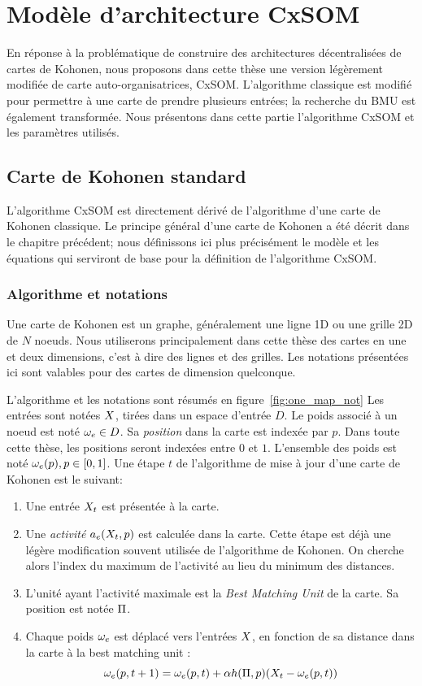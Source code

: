 \chapter{Modèle d'architecture CxSOM}
\graphicspath{{02-SOM/}}
\minitoc

En réponse à la problématique de construire des architectures décentralisées de cartes de Kohonen, nous proposons dans cette thèse une version légèrement modifiée de carte auto-organisatrices, CxSOM. L'algorithme classique est modifié pour permettre à une carte de prendre plusieurs entrées; la recherche du BMU est également transformée.
Nous présentons dans cette partie l'algorithme CxSOM et les paramètres utilisés.

\section{Carte de Kohonen standard}
L'algorithme CxSOM est directement dérivé de l'algorithme d'une carte de Kohonen classique. Le principe général d'une carte de Kohonen a été décrit dans le chapitre précédent; nous définissons ici plus précisément le modèle et les équations qui serviront de base pour la définition de l'algorithme CxSOM.

\subsection{Algorithme et notations}
Une carte de Kohonen est un graphe, généralement une ligne 1D ou une grille 2D de $N$ noeuds. Nous utiliserons principalement dans cette thèse des cartes en une et deux dimensions, c'est à dire des lignes et des grilles. Les notations présentées ici sont valables pour des cartes de dimension quelconque.

L'algorithme et les notations sont résumés en figure~\ref{fig:one_map_not}
Les entrées sont notées $X$, tirées dans un espace d'entrée $D$. Le poids associé à un noeud est noté $\omega_e \in D$. Sa \emph{position} dans la carte est indexée par $p$. Dans toute cette thèse, les positions seront indexées entre $0$ et $1$. L'ensemble des poids est noté ${\omega_e(p), p \in [0,1]}$.
Une étape $t$ de l'algorithme de mise à jour d'une carte de Kohonen est le suivant:
\begin{enumerate}
\item\label{enum:inp} Une entrée $X_t$ est présentée à la carte.
\item\label{enum:act} Une \emph{activité} $a_e(X_t,p)$ est calculée dans la carte. Cette étape est déjà une légère modification souvent utilisée de l'algorithme de Kohonen. On cherche alors l'index du maximum de l'activité au lieu du minimum des distances.
\item L'unité ayant l'activité maximale est la \emph{Best Matching Unit} de la carte. Sa position est notée $\Pi$.
\item Chaque poids $\omega_e$ est déplacé vers l'entrées $X$, en fonction de sa distance dans la carte à la best matching unit : 
\begin{equation}
\omega_e(p,t+1) = \omega_e(p,t) + \alpha h(\Pi,p)(X_t - \omega_e(p,t))
\label{eq:update}
\end{equation}
\end{enumerate}

